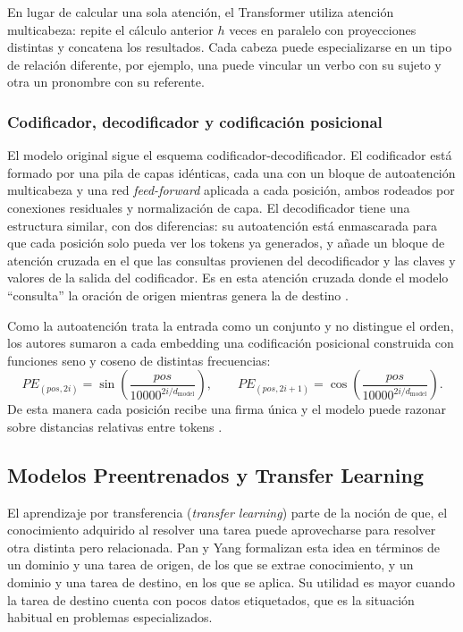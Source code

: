 En lugar de calcular una sola atención, el Transformer utiliza atención multicabeza: repite el cálculo anterior $h$ veces en paralelo con proyecciones distintas y concatena los resultados. Cada cabeza puede especializarse en un tipo de relación diferente, por ejemplo, una puede vincular un verbo con su sujeto y otra un pronombre con su referente.


\subsubsection{Codificador, decodificador y codificación posicional}


El modelo original sigue el esquema codificador-decodificador. El codificador está formado por una pila de capas idénticas, cada una con un bloque de autoatención multicabeza y una red \textit{feed-forward} aplicada a cada posición, ambos rodeados por conexiones residuales y normalización de capa. El decodificador tiene una estructura similar, con dos diferencias: su autoatención está enmascarada para que cada posición solo pueda ver los tokens ya generados, y añade un bloque de atención cruzada en el que las consultas provienen del decodificador y las claves y valores de la salida del codificador. Es en esta atención cruzada donde el modelo ``consulta'' la oración de origen mientras genera la de destino \cite{vaswani2017attention}.

Como la autoatención trata la entrada como un conjunto y no distingue el orden, los autores sumaron a cada embedding una codificación posicional construida con funciones seno y coseno de distintas frecuencias:
\begin{equation}
PE_{(pos, 2i)} = \sin\left(\frac{pos}{10000^{2i/d_{\text{model}}}}\right), \qquad
PE_{(pos, 2i+1)} = \cos\left(\frac{pos}{10000^{2i/d_{\text{model}}}}\right).
\end{equation}
De esta manera cada posición recibe una firma única y el modelo puede razonar sobre distancias relativas entre tokens \cite{vaswani2017attention}.

\vspace{0.5cm}
\subsection{Modelos Preentrenados y Transfer Learning}
\vspace{0.2cm}

El aprendizaje por transferencia (\textit{transfer learning}) parte de la noción de que, el conocimiento adquirido al resolver una tarea puede aprovecharse para resolver otra distinta pero relacionada. Pan y Yang \cite{pan2010survey} formalizan esta idea en términos de un dominio y una tarea de origen, de los que se extrae conocimiento, y un dominio y una tarea de destino, en los que se aplica. Su utilidad es mayor cuando la tarea de destino cuenta con pocos datos etiquetados, que es la situación habitual en problemas especializados.

